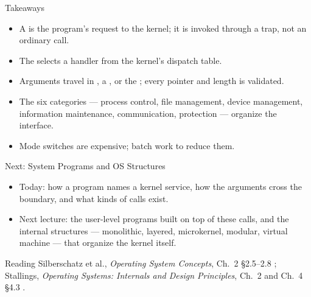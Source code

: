 \documentclass[aspectratio=169]{beamer}
\begin{document}
\begin{frame}{Takeaways}
  \begin{itemize}
    \item A  is the program's request to the kernel; it is
      invoked through a trap, not an ordinary call.
    \item The  selects a handler from the kernel's
      dispatch table.
    \item Arguments travel in , a , or the
      ; every pointer and length is validated.
    \item The six categories --- process control, file management, device
      management, information maintenance, communication, protection ---
      organize the interface.
    \item Mode switches are expensive; batch work to reduce them.
  \end{itemize}
\end{frame}

\begin{frame}{Next: System Programs and OS Structures}
  \begin{itemize}
    \item Today: how a program names a kernel service, how the arguments cross
      the boundary, and what kinds of calls exist.
    \item Next lecture: the user-level programs built on top of these calls,
      and the internal structures --- monolithic, layered, microkernel,
      modular, virtual machine --- that organize the kernel itself.
  \end{itemize}
  \vspace{0.3cm}
  \begin{block}{Reading}
    Silberschatz et al., \emph{Operating System Concepts}, Ch.~2
    \S2.5--2.8 \cite{SilberschatzOSC_operating_system_concepts}; Stallings,
    \emph{Operating Systems: Internals and Design Principles}, Ch.~2 and
    Ch.~4 \S4.3 \cite{StallingsOS_internals_design_principles}.
  \end{block}
\end{frame}
\end{document}
